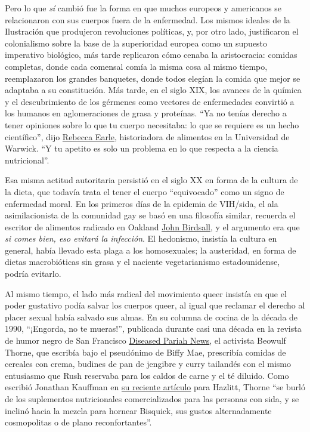 Pero lo que \emph{sí} cambió fue la forma en que muchos europeos y
americanos se relacionaron con sus cuerpos fuera de la enfermedad. Los
mismos ideales de la Ilustración que produjeron revoluciones políticas,
y, por otro lado, justificaron el colonialismo sobre la base de la
superioridad europea como un supuesto imperativo biológico, más tarde
replicaron cómo cenaba la aristocracia: comidas completas, donde cada
comensal comía la misma cosa al mismo tiempo, reemplazaron los grandes
banquetes, donde todos elegían la comida que mejor se adaptaba a su
constitución. Más tarde, en el siglo XIX, los avances de la química y el
descubrimiento de los gérmenes como vectores de enfermedades convirtió a
los humanos en aglomeraciones de grasa y proteínas. ``Ya no tenías
derecho a tener opiniones sobre lo que tu cuerpo necesitaba: lo que se
requiere es un hecho científico'', dijo
\href{https://warwick.ac.uk/fac/arts/history/people/staff_index/earle/}{Rebecca
Earle}, historiadora de alimentos en la Universidad de Warwick. ``Y tu
apetito es solo un problema en lo que respecta a la ciencia
nutricional''.

Esa misma actitud autoritaria persistió en el siglo XX en forma de la
cultura de la dieta, que todavía trata el tener el cuerpo ``equivocado''
como un signo de enfermedad moral. En los primeros días de la epidemia
de VIH/sida, el ala asimilacionista de la comunidad gay se basó en una
filosofía similar, recuerda el escritor de alimentos radicado en Oakland
\href{https://www.john-birdsall.com/}{John Birdsall}, y el argumento era
que \emph{si comes bien, eso evitará la infección}. El hedonismo,
insistía la cultura en general, había llevado esta plaga a los
homosexuales; la austeridad, en forma de dietas macrobióticas sin grasa
y el naciente vegetarianismo estadounidense, podría evitarlo.

Al mismo tiempo, el lado más radical del movimiento queer insistía en
que el poder gustativo podía salvar los cuerpos queer, al igual que
reclamar el derecho al placer sexual había salvado sus almas. En su
columna de cocina de la década de 1990, ``¡Engorda, no te
mueras!''\emph{,} publicada durante casi una década en la revista de
humor negro de San Francisco
\href{https://calisphere.org/collections/22661/?fbclid=IwAR2XcihgRMuSlZePJfzGuwyfZhaKWUutxnHqZQworbMUDdoOj0wpYYNf-5s}{Diseased
Pariah News}, el activista Beowulf Thorne, que escribía bajo el
pseudónimo de Biffy Mae, prescribía comidas de cereales con crema,
budines de pan de jengibre y curry tailandés con el mismo entusiasmo que
Rush reservaba para los caldos de carne y el té diluido. Como escribió
Jonathan Kauffman en
\href{https://hazlitt.net/longreads/get-fat-dont-die}{su reciente
artículo} para Hazlitt, Thorne ``se burló de los suplementos
nutricionales comercializados para las personas con sida, y se inclinó
hacia la mezcla para hornear Bisquick, sus gustos alternadamente
cosmopolitas o de plano reconfortantes''.

